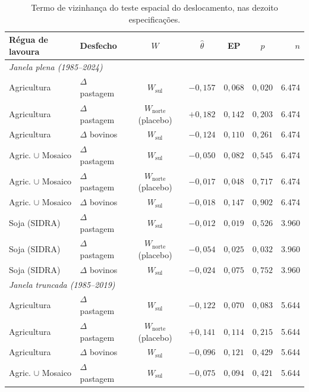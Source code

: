 \begin{table}[!ht]
\centering
\caption[Termo de vizinhança do teste espacial]{Termo de vizinhança do teste espacial do deslocamento, nas dezoito especificações.}
\label{tab:slx}
\small
\begin{tabular}{llccccr}
\toprule
\textbf{Régua de lavoura} & \textbf{Desfecho} & \textbf{$W$} & \textbf{$\hat{\theta}$} & \textbf{EP} & \textbf{$p$} & \textbf{$n$} \\
\midrule
\multicolumn{7}{l}{\textit{Janela plena (1985--2024)}} \\
Agricultura & $\Delta$ pastagem & $W_{\mathrm{sul}}$ & $-0{,}157$ & $0{,}068$ & $0{,}020$ & 6.474 \\
Agricultura & $\Delta$ pastagem & $W_{\mathrm{norte}}$ (placebo) & $+0{,}182$ & $0{,}142$ & $0{,}203$ & 6.474 \\
Agricultura & $\Delta$ bovinos & $W_{\mathrm{sul}}$ & $-0{,}124$ & $0{,}110$ & $0{,}261$ & 6.474 \\
Agric. $\cup$ Mosaico & $\Delta$ pastagem & $W_{\mathrm{sul}}$ & $-0{,}050$ & $0{,}082$ & $0{,}545$ & 6.474 \\
Agric. $\cup$ Mosaico & $\Delta$ pastagem & $W_{\mathrm{norte}}$ (placebo) & $-0{,}017$ & $0{,}048$ & $0{,}717$ & 6.474 \\
Agric. $\cup$ Mosaico & $\Delta$ bovinos & $W_{\mathrm{sul}}$ & $-0{,}018$ & $0{,}147$ & $0{,}902$ & 6.474 \\
Soja (SIDRA) & $\Delta$ pastagem & $W_{\mathrm{sul}}$ & $-0{,}012$ & $0{,}019$ & $0{,}526$ & 3.960 \\
Soja (SIDRA) & $\Delta$ pastagem & $W_{\mathrm{norte}}$ (placebo) & $-0{,}054$ & $0{,}025$ & $0{,}032$ & 3.960 \\
Soja (SIDRA) & $\Delta$ bovinos & $W_{\mathrm{sul}}$ & $-0{,}024$ & $0{,}075$ & $0{,}752$ & 3.960 \\
\multicolumn{7}{l}{\textit{Janela truncada (1985--2019)}} \\
Agricultura & $\Delta$ pastagem & $W_{\mathrm{sul}}$ & $-0{,}122$ & $0{,}070$ & $0{,}083$ & 5.644 \\
Agricultura & $\Delta$ pastagem & $W_{\mathrm{norte}}$ (placebo) & $+0{,}141$ & $0{,}114$ & $0{,}215$ & 5.644 \\
Agricultura & $\Delta$ bovinos & $W_{\mathrm{sul}}$ & $-0{,}096$ & $0{,}121$ & $0{,}429$ & 5.644 \\
Agric. $\cup$ Mosaico & $\Delta$ pastagem & $W_{\mathrm{sul}}$ & $-0{,}075$ & $0{,}094$ & $0{,}421$ & 5.644 \\

\end{tabular}
\end{table}
